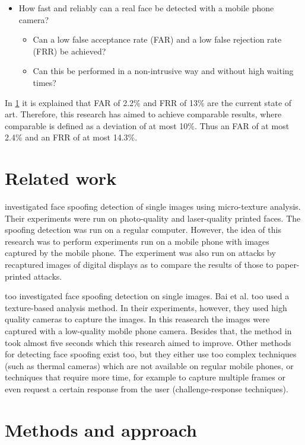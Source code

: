 \documentclass{sig-alternate-br}
\begin{document}
\begin{itemize}
	\item How fast and reliably can a real face be detected with a mobile phone camera?
	\begin{itemize}
		\item Can a low false acceptance rate (FAR) and a low false rejection rate (FRR) be achieved?
		\item Can this be performed in a non-intrusive way and without high waiting times?
	\end{itemize}
\end{itemize}
In \ref{related} it is explained that FAR of 2.2\% and FRR of 13\% are the current state of art. Therefore, this research has aimed to achieve comparable results, where comparable is defined as a deviation of at most 10\%. Thus an FAR of at most 2.4\% and an FRR of at most 14.3\%.

\section{Related work} \label{related}
\cite{maatta2011face} investigated face spoofing detection of single images using micro-texture analysis. Their experiments were run on photo-quality and laser-quality printed faces. The spoofing detection was run on a regular computer. However, the idea of this research was to perform experiments run on a mobile phone with images captured by the mobile phone. The experiment was also run on attacks by recaptured images of digital displays as to compare the results of those to paper-printed attacks.

\cite{bai2010physics} too investigated face spoofing detection on single images. Bai et al. too used a texture-based analysis method. In their experiments, however, they used high quality cameras to capture the images. In this reasearch the images were captured with a low-quality mobile phone camera. Besides that, the method in \cite{bai2010physics} took almost five seconds which this research aimed to improve.
Other methods for detecting face spoofing exist too, but they either use too complex techniques (such as thermal cameras) which are not available on regular mobile phones, or techniques that require more time, for example to capture multiple frames or even request a certain response from the user (challenge-response techniques).

\section{Methods and approach} \label{methods}
\end{document}
